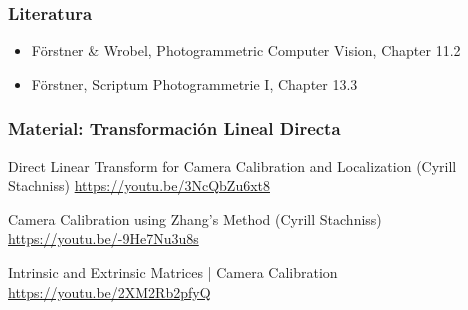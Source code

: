 \begin{frame}
  \frametitle{Literatura}
  \begin{itemize}
    \item Förstner \& Wrobel, Photogrammetric Computer Vision, Chapter 11.2
    \item Förstner, Scriptum Photogrammetrie I, Chapter 13.3
  \end{itemize}
\end{frame}

\begin{frame}
  \frametitle{Material: Transformación Lineal Directa}

  Direct Linear Transform for Camera Calibration and Localization (Cyrill Stachniss)
  \url{https://youtu.be/3NcQbZu6xt8}

  Camera Calibration using Zhang's Method (Cyrill Stachniss)
  \url{https://youtu.be/-9He7Nu3u8s}

  Intrinsic and Extrinsic Matrices | Camera Calibration
  \url{https://youtu.be/2XM2Rb2pfyQ}

\end{frame}
